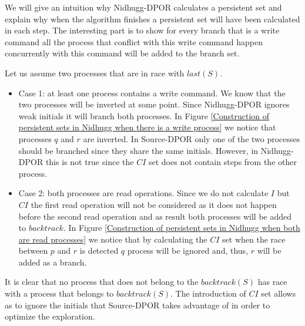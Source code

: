 We will give an intuition why Nidhugg-DPOR calculates a persistent set and explain why when the algorithm finishes a persistent set will have been calculated in each step.
The interesting part is to show for every branch that is a write command all the process that conflict with this write command happen concurrently with this
command will be added to the branch set.

Let us assume two processes that are in race with $last(S)$.
\begin{itemize}

\item Case 1: at least one process contains a write command.
We know that the two processes will be inverted at some point. Since Nidhugg-DPOR ignores weak initials it will branch both processes. 
In Figure \ref{Construction of persistent sets in Nidhugg when there is a write process} we notice that processes $q$ and $r$ are inverted. In Source-DPOR only one of the two processes should be branched since
they share the same initials. However, in Nidhugg-DPOR this is not true since the $CI$ set does not contain steps from the other process.


\item Case 2: both processes are read operations.
Since we do not calculate $I$ but $CI$ the first read operation will not be considered as it does not happen before the second read operation and as result
both processes will be added to $backtrack$. In Figure \ref{Construction of persistent sets in Nidhugg when both are read processes} we notice that by calculating the $CI$ set when the race
between $p$ and $r$ is detected $q$ process will be ignored and, thus, $r$ will be added as a branch.


\end{itemize}

It is clear that no process that does not belong to the $backtrack(S)$ has race with a process that belongs to $backtrack(S)$. The introduction of $CI$ set allows
as to ignore the initials that Source-DPOR takes advantage of in order to optimize the exploration.
